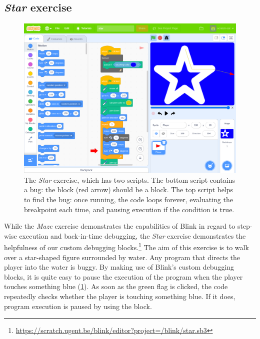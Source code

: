 \documentclass[../main]{subfiles}
\begin{document}
\subsection{\emph{Star} exercise}\label{subsec:star-exercise}

\begin{figure}
    \begin{wide}
        \includegraphics[width=\linewidth]{star}
    \end{wide}
    \caption[The Star exercise.]{
        The \emph{Star} exercise, which has two scripts.
        The bottom script contains a bug: the  block (red arrow) should be a  block.
        The top script helps to find the bug: once running, the code loops forever, evaluating the breakpoint each time, and pausing execution if the condition is true.
    }
    \label{fig:star-exercise}
\end{figure}

While the \emph{Maze} exercise demonstrates the capabilities of Blink in regard to step-wise execution and back-in-time debugging, the \emph{Star} exercise demonstrates the helpfulness of our custom debugging blocks.\footnote{\url{https://scratch.ugent.be/blink/editor?project=/blink/star.sb3}}
The aim of this exercise is to walk over a star-shaped figure surrounded by water.
Any program that directs the player into the water is buggy.
By making use of Blink's custom debugging blocks, it is quite easy to pause the execution of the program when the player touches something blue (\cref{fig:star-exercise}).
As soon as the green flag is clicked, the code repeatedly checks whether the player is touching something blue.
If it does, program execution is paused by using the  block.
\end{document}
